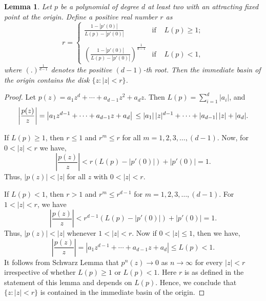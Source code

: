 \documentclass[12pt]{article}
\newtheorem{lem}{Lemma}[section]
\numberwithin{equation}{section}
\begin{document}
\begin{lem}\label{disk_in_imm}
	Let $p$ be a polynomial of degree $d$ at least two with an attracting fixed point at the origin. Define a positive real number $r$ as
	\begin{equation*}
	r = \left\{\begin{array}{ccc}
	\frac{1- |p'(0)|}{L(p)-|p'(0)|} & \text {if } & L(p) \geq 1; \\
	\\
	\left(\frac{1- |p'(0)|}{L(p)-|p'(0)|}\right)^{\frac{1}{d-1}}& \text {if  } & L(p) <1,
	\end{array}\right.
	\end{equation*} where $(.)^{\frac{1}{d-1}}$ denotes the positive $(d-1)$-th root.  Then the immediate basin of the origin contains the disk $\{z: |z|< r\}$.
\end{lem}
\begin{proof}
Let $p(z)=a_1 z^d +\cdots +a_{d-1}z^2+a_d z$. Then $L(p)=\sum_{i=1}^{d} |a_i|$, and
$$
\left|\frac{p(z)}{z}\right| =  \left|a_1 z^{d-1}+\cdots+a_{d-1}z+a_d\right| \\
\leq \left|a_1\right||z|^{d-1}+\cdots+\left|a_{d-1}\right||z|+|a_d|.
$$
\par If $L(p) \geq 1$, then $r \leq 1$ and $r^{m} \leq r$ for all $m=1,2,3, \dots, (d-1)$. Now, for $0<|z|<r$ we have,
$$\left|\frac{p(z)}{z}\right| < r \left( L(p) - |p'(0)| \right)  +|p'(0)| 
 =1.$$
Thus, $|p(z)|<|z|$ for all $z$ with $ 0< |z|<r$.
	
	\par 
	If $L(p) < 1$, then $r>1$ and $r^{m} \leq  r^{d-1}$ for $m =1,2,3,\dots, (d-1)$. For $1<|z|<r$, we have  
$$	\left|\frac{p(z)}{z}\right|  <r^{d-1}(L(p)-|p'(0)|)+|p'(0)|
 =1.
$$
	Thus, $|p(z)|<|z|$ whenever $1<|z|<r$. Now if $0<|z| \leq 1$, then we have, 
$$ \left|\frac{p(z)}{z}\right|=  \left|a_1 z^{d-1}+\cdots+a_{d-1}z+a_d\right|  \leq L(p) < 1.
$$
It follows from Schwarz Lemma that $p^n (z) \to 0$ as $n \to \infty$ for every
$|z|<r$ irrespective of whether $L(p) \geq 1$ or $L(p) <1$. Here $r$ is as defined in the statement of this lemma and depends on $L(p)$.	Hence, we conclude that $\{z: |z|<r\}$ is contained in the immediate basin of the origin.
\end{proof}
\end{document}
